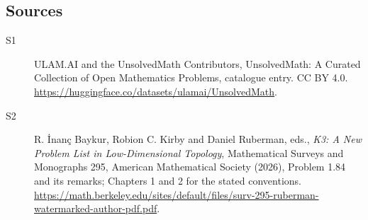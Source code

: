 \documentclass[11pt]{article}
\begin{document}
\subsection{Sources}
\begin{description}
\item[\hypertarget{source:statement:1}{S1}] ULAM.AI and the UnsolvedMath Contributors, UnsolvedMath: A Curated Collection of Open Mathematics Problems, catalogue entry. CC BY 4.0. \url{https://huggingface.co/datasets/ulamai/UnsolvedMath}.
\item[\hypertarget{source:statement:2}{S2}] R. İnanç Baykur, Robion C. Kirby and Daniel Ruberman, eds., \emph{K3: A New Problem List in Low-Dimensional Topology}, Mathematical Surveys and Monographs 295, American Mathematical Society (2026), Problem 1.84 and its remarks; Chapters 1 and 2 for the stated conventions. \url{https://math.berkeley.edu/sites/default/files/surv-295-ruberman-watermarked-author-pdf.pdf}.
\end{description}
\label{end:statement}
\end{document}

